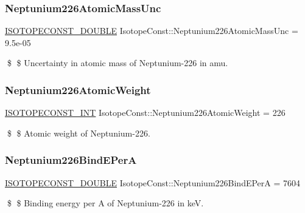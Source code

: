 \subsubsection{\texorpdfstring{Neptunium226\+Atomic\+Mass\+Unc}{Neptunium226AtomicMassUnc}}
{\footnotesize\ttfamily \mbox{\hyperlink{group___isotope_const-_macros_ga8f45a7272ce02c0b4c65c44636ed719a}{I\+S\+O\+T\+O\+P\+E\+C\+O\+N\+S\+T\+\_\+\+D\+O\+U\+B\+LE}} Isotope\+Const\+::\+Neptunium226\+Atomic\+Mass\+Unc = 9.\+5e-\/05}

\$ \$ Uncertainty in atomic mass of Neptunium-\/226 in amu. \mbox{\label{group___isotope_const-_neptunium-_np226_gae607e42080ee6815acc600efda2417d9}} 
\subsubsection{\texorpdfstring{Neptunium226\+Atomic\+Weight}{Neptunium226AtomicWeight}}
{\footnotesize\ttfamily \mbox{\hyperlink{group___isotope_const-_macros_ga5f18360b3e99483a35c32d789e62621c}{I\+S\+O\+T\+O\+P\+E\+C\+O\+N\+S\+T\+\_\+\+I\+NT}} Isotope\+Const\+::\+Neptunium226\+Atomic\+Weight = 226}

\$ \$ Atomic weight of Neptunium-\/226. \mbox{\label{group___isotope_const-_neptunium-_np226_gacb5744318b3642a85d05752d7e8b1d99}} 
\subsubsection{\texorpdfstring{Neptunium226\+Bind\+E\+PerA}{Neptunium226BindEPerA}}
{\footnotesize\ttfamily \mbox{\hyperlink{group___isotope_const-_macros_ga8f45a7272ce02c0b4c65c44636ed719a}{I\+S\+O\+T\+O\+P\+E\+C\+O\+N\+S\+T\+\_\+\+D\+O\+U\+B\+LE}} Isotope\+Const\+::\+Neptunium226\+Bind\+E\+PerA = 7604}

\$ \$ Binding energy per A of Neptunium-\/226 in keV. \mbox{\label{group___isotope_const-_neptunium-_np226_ga374506e156e5c340d0867a5bbf599eef}} 
